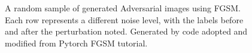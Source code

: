 \documentclass[twoside,twocolumn]{article}
\begin{document}
\begin{figure}[!htb]
    
	\centering

	
	\caption{A random sample of generated Adversarial images using FGSM. Each row represents a different noise level, with the labels before and after the perturbation noted. Generated by code adopted and modified from Pytorch FGSM tutorial.}
	\label{fig:adversarialgenerated}
\end{figure}
\end{document}
